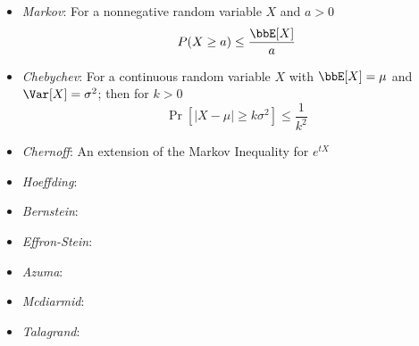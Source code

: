 \begin{itemize}
\item \textit{Markov}: For a nonnegative random variable $X$ and $a > 0$ $$P(X \geq a) \leq \frac{\bbE[X]}{a}$$ 
\item \textit{Chebychev}: For a continuous random variable $X$ with $\bbE[X] = \mu$ and $\Var[X] = \sigma^2$; then for $k>0$
$$\Pr[|X-\mu| \geq k\sigma^2 ] \leq \frac{1}{k^2}$$
\item \textit{Chernoff}: An extension of the Markov Inequality for $e^{tX}$
\item \textit{Hoeffding}: 
\item \textit{Bernstein}: 
\item \textit{Effron-Stein}: 
\item \textit{Azuma}: 
\item \textit{Mcdiarmid}: 
\item \textit{Talagrand}: 
\end{itemize}
